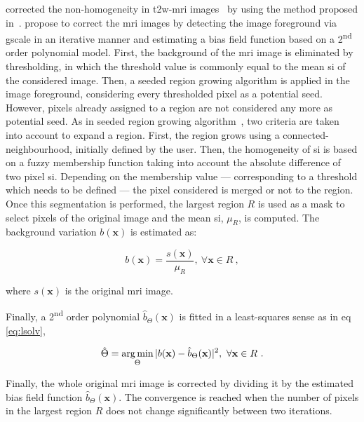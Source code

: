 \citeauthor{Lv2009} corrected the non-homogeneity in \ac{t2w}-\ac{mri} images~\cite{Lv2009} by using the method proposed in~\cite{Madabhushi2006}.
\citeauthor{Madabhushi2006} propose to correct the \ac{mri} images by detecting the image foreground via \ac{gscale} in an iterative manner and estimating a bias field function based on a 2\textsuperscript{nd} order polynomial model.
First, the background of the \ac{mri} image is eliminated by thresholding, in which the threshold value is commonly equal to the mean \ac{si} of the considered image.
Then, a seeded region growing algorithm is applied in the image foreground, considering every thresholded pixel as a potential seed.
However, pixels already assigned to a region are not considered any more as potential seed.
As in seeded region growing algorithm~\cite{Shapiro2001}, two criteria are taken into account to expand a region.
First, the region grows using a connected-neighbourhood, initially defined by the user.
Then, the homogeneity of \ac{si} is based on a fuzzy membership function taking into account the absolute difference of two pixel \ac{si}.
Depending on the membership value --- corresponding to a threshold which needs to be defined --- the pixel considered is merged or not to the region.
Once this segmentation is performed, the largest region $R$ is used as a mask to select pixels of the original image and the mean \ac{si}, $\mu_{R}$, is computed. 
The background variation $b(\mathbf{x})$ is estimated as:

\begin{equation}
	b(\mathbf{x}) = \frac{s(\mathbf{x})}{\mu_{R}}, \ \forall \mathbf{x} \in R \ ,
	\label{eq:backest}
\end{equation}

\noindent where $s(\mathbf{x})$ is the original \ac{mri} image.

Finally, a 2\textsuperscript{nd} order polynomial $\hat{b}_{\Theta}(\mathbf{x})$ is fitted in a least-squares sense as in \acs{eq}\,\eqref{eq:lsolv},

\begin{equation}
	\hat{\Theta} = \operatorname*{arg\,min}_{\Theta} | b(\mathbf{x}) - \hat{b}_{\Theta}(\mathbf{x}) |^{2}, \ \forall \mathbf{x} \in R \ .
	\label{eq:lsolv}
\end{equation}

Finally, the whole original \ac{mri} image is corrected by dividing it by the estimated bias field function $\hat{b}_{\Theta}(\mathbf{x})$.
The convergence is reached when the number of pixels in the largest region $R$ does not change significantly between two iterations.

